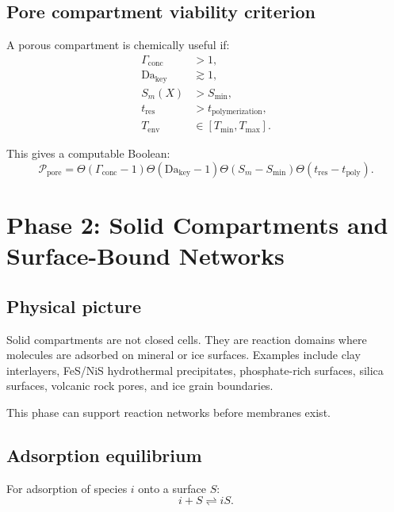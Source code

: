 \documentclass[11pt]{article}
\begin{document}
\subsection{Pore compartment viability criterion}

A porous compartment is chemically useful if:
\begin{align}
    \Gamma_{\mathrm{conc}} &> 1, \\
    \mathrm{Da}_{\mathrm{key}} &\gtrsim 1, \\
    S_m(X) &> S_{\mathrm{min}}, \\
    t_{\mathrm{res}} &> t_{\mathrm{polymerization}}, \\
    T_{\mathrm{env}} &\in [T_{\mathrm{min}},T_{\mathrm{max}}].
\end{align}

This gives a computable Boolean:
\begin{equation}
    \mathcal{P}_{\mathrm{pore}} =
    \Theta(\Gamma_{\mathrm{conc}}-1)
    \Theta(\mathrm{Da}_{\mathrm{key}}-1)
    \Theta(S_m-S_{\mathrm{min}})
    \Theta(t_{\mathrm{res}}-t_{\mathrm{poly}}).
\end{equation}

\section{Phase 2: Solid Compartments and Surface-Bound Networks}

\subsection{Physical picture}

Solid compartments are not closed cells. They are reaction domains where
molecules are adsorbed on mineral or ice surfaces. Examples include clay
interlayers, FeS/NiS hydrothermal precipitates, phosphate-rich surfaces, silica
surfaces, volcanic rock pores, and ice grain boundaries.

This phase can support reaction networks before membranes exist.

\subsection{Adsorption equilibrium}

For adsorption of species $i$ onto a surface $S$:
\begin{equation}
    i + S \rightleftharpoons iS.
\end{equation}
\end{document}
